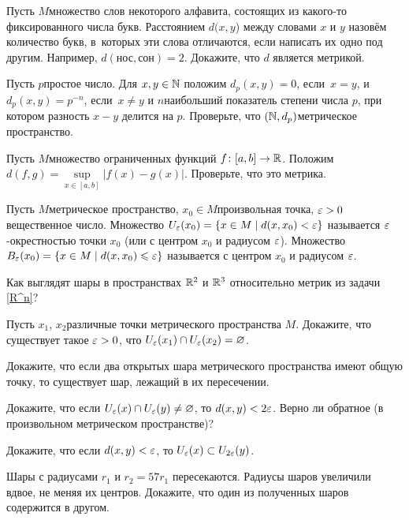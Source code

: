 \documentclass[a4paper,12pt]{article}
\begin{document}
Пусть $M$\т множество слов некоторого алфавита, состоящих из какого-то фиксированного числа букв. Расстоянием $d (x,y$) между словами $x$ и $y$ назовём количество букв, в~которых эти слова отличаются, если написать их одно под другим. Например, $d(\text{нос},\text{сон}) = 2$. Докажите, что $d$ является метрикой.

Пусть $p$\т простое число. Для $x, y \in \mathbb{N}$ положим $d_p(x,y) = 0$, если~$x = y$, и $d_p(x,y) = p^{-n}$, если~$x \ne y$ и $n$\т наибольший показатель степени числа $p$, при котором разность $x-y$ делится на $p$. Проверьте, что $(\mathbb{N}, d_p)$\т метрическое пространство.

\label{C}
Пусть $M$\т множество ограниченных функций $f\colon [a,b] \rightarrow \mathbb{R}$. Положим $d (f,g) = \sup\limits_{x\in [a,b]}|f(x) - g(x)|$. Проверьте, что это метрика.

\newpage

Пусть $M$\т метрическое пространство, $x_0\in M$\т произвольная точка, $\varepsilon > 0$\т вещественное число. Множество $U_\varepsilon(x_0) = \{ x\in M \mid d(x, x_0) < \varepsilon\}$ называется $\varepsilon$-окрестностью точки $x_0$ (или  с центром $x_0$ и радиусом $\varepsilon$).
Множество $B_\varepsilon(x_0) = \{ x\in M \mid d(x,x_0)\leqslant\varepsilon\}$ называется  с центром $x_0$ и радиусом $\varepsilon$.

Как выглядят шары в пространствах $\mathbb{R}^2$ и $\mathbb{R}^3$ относительно метрик из
задачи \ref{R^n}?

Пусть $x_1$, $x_2$\т различные точки метрического пространства $M$. Докажите, что существует такое $\varepsilon > 0$, что $U_\varepsilon(x_1) \cap U_\varepsilon(x_2) = \varnothing$.

Докажите, что если два открытых шара метрического пространства имеют общую точку, то существует шар, лежащий в их пересечении.

Докажите, что если $U_{\varepsilon}(x) \cap U_{\varepsilon}(y) \ne \varnothing$, то $d (x,y) < 2\varepsilon$. Верно ли обратное (в произвольном метрическом пространстве)?

Докажите, что если $d(x,y) < \varepsilon$, то $U_\varepsilon(x) \subset U_{2\varepsilon}(y)$.

Шары с радиусами $r_1$ и $r_2 = 57 r_1$ пересекаются. Радиусы шаров увеличили вдвое, не меняя их центров. Докажите, что один из полученных шаров содержится в другом.
\end{document}
